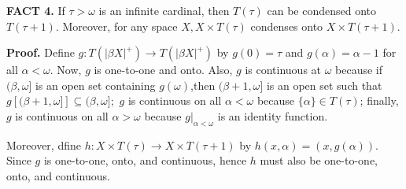 \documentclass{article}
\begin{document}
\textbf{FACT 4.} If $\tau>\omega$ is an infinite cardinal, then $T(\tau)$ can be condensed onto $T(\tau+1).$ Moreover, for any space $X, X\times T(\tau)$ condenses onto $X\times T(\tau+1).$

\vskip 15pt

\textbf{Proof.} Define $g:T(|\beta X|^+) \rightarrow T(|\beta X|^+)$ by $g(0)=\tau$ and $g(\alpha)=\alpha-1$ for all $\alpha<\omega$. Now, $g$ is one-to-one and onto. Also, $g$ is continuous at $\omega$ because if $(\beta, \omega]$ is an open set containing $g(\omega)$,then $(\beta+1,\omega]$ is an open set such that $g\left[(\beta+1, \omega]\right] \subseteq (\beta, \omega];$ $g$ is continuous on all $\alpha<\omega$ because $\{\alpha\} \in T(\tau)$; finally, $g$ is continuous on all $\alpha>\omega$ because $g|_{\alpha<\omega}$ is an identity function. 

\vskip 10pt


Moreover, dfine $h: X\times T(\tau)\rightarrow X\times T(\tau+1)$ by $h(x,\alpha)=(x,g(\alpha)).$ Since $g$ is one-to-one, onto, and continuous, hence $h$ must also be one-to-one, onto, and continuous. 
\end{document}

